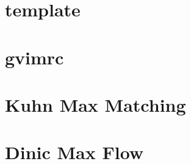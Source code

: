 \documentclass[10pt]{article}
\begin{document}
\section{template}

\section{gvimrc}

\section{Kuhn Max Matching}

\section{Dinic Max Flow}

\end{document}
